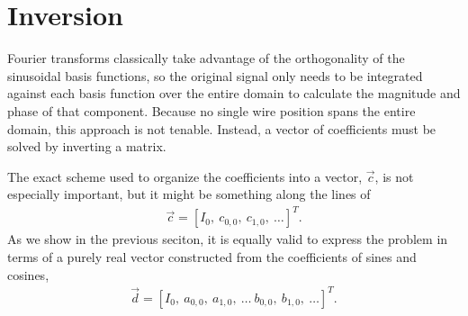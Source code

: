 \documentclass{article}
\begin{document}
\section{Inversion}

Fourier transforms classically take advantage of the orthogonality of the sinusoidal basis functions, so the original signal only needs to be integrated against each basis function over the entire domain to calculate the magnitude and phase of that component.  Because no single wire position spans the entire domain, this approach is not tenable.  Instead, a vector of coefficients must be solved by inverting a matrix.

The exact scheme used to organize the coefficients into a vector, $\vec{c}$, is not especially important, but it might be something along the lines of 
\begin{align}
\vec{c} = [I_0,\ c_{0,0},\ c_{1,0},\ \ldots ]^T.
\end{align}
As we show in the previous seciton, it is equally valid to express the problem in terms of a purely real vector constructed from the coefficients of sines and cosines,
\begin{align}
\vec{d} = [I_0,\ a_{0,0},\ a_{1,0},\ \ldots\ b_{0,0},\ b_{1,0},\ \ldots]^T.
\end{align}
\end{document}
